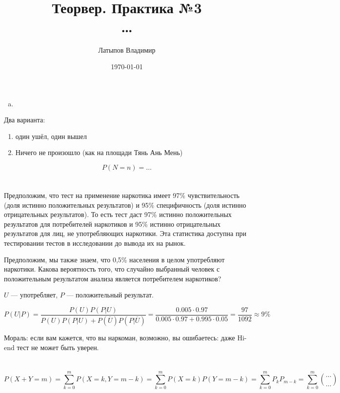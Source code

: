\documentclass[12pt, a4paper]{article}
\title{Теорвер. Практика №3 \\ \large …}
\author{
  Латыпов Владимир
}
\date{\today}
\begin{document}
\maketitle


\section{}

\begin{enumerate}[(a)]
    \item 
\end{enumerate}

Два варианта: 

\begin{enumerate}
    \item один ушёл, один вышел
    \item Ничего не произошло (как на площади Тянь Ань Мень)
\end{enumerate}

\begin{equation}
    P(N = n) = …
\end{equation}

\section{}

Предположим, что тест на применение наркотика имеет 97\% чувствительность
(доля истинно положительных результатов)
и 95\% специфичность (доля истинно отрицательных результатов). То есть тест даст 97\% истинно положительных результатов для потребителей наркотиков и 
95\% истинно отрицательных результатов для лиц, не употребляющих наркотики.
Эта статистика доступна при тестировании тестов в исследовании до вывода их на рынок. 

Предположим, мы также знаем, что 0,5\% населения в целом употребляют наркотики.
Какова вероятность того, что случайно выбранный человек с положительным результатом
анализа является потребителем наркотиков?

$U$ — употребляет, $P$ — положительный результат.

\begin{equation}
    P(U | P) = \frac{P(U) P(P | U)}{P(U)P(P | U) + P(\overline{U})P(P | \overline{U})} 
    = \frac{0.005 \cdot 0.97}{0.005 \cdot 0.97 + 0.995 \cdot 0.05} = \frac{97}{1092} ≈ 9\%
\end{equation}

Мораль: если вам кажется, что вы наркоман, возможно, вы ошибаетесь:
даже Hi-end тест не может быть уверен.



\section{}

\begin{equation}
    P(X + Y = m) = \sum_{k = 0}^{m} P(X = k, Y = m - k) = \sum_{k = 0}^{m} P(X = k) P(Y = m - k) = \sum_{k = 0}^{m} P_{k} P_{m - k} = 
    \sum_{k = 0}^{m} \binom{…}{…}
\end{equation}
\end{document}
